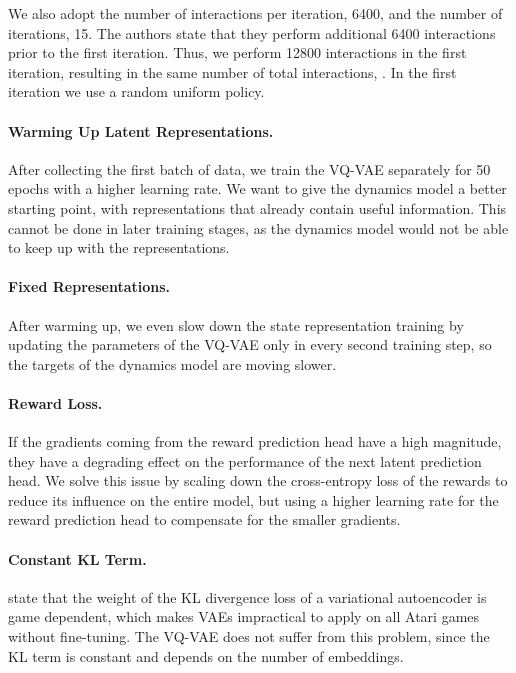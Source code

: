 \documentclass{article}
\begin{document}
We also adopt the number of interactions per iteration,
\num{6400}, and the number of iterations, \num{15}. The authors state that they
perform additional \num{6400} interactions prior to the first iteration. Thus,
we perform \num{12800} interactions in the first iteration, resulting in the
same number of total interactions, .
In the first iteration we use a random uniform policy.

\paragraph{Warming Up Latent Representations.}
After collecting the first batch of data, we train the VQ-VAE separately for
\num{50} epochs with a higher learning rate. We want to give the dynamics model
a better starting point, with representations that already contain useful
information. This cannot be done in later training stages, as the dynamics
model would not be able to keep up with the representations.

\paragraph{Fixed Representations.}
After warming up, we even slow down the state representation training by
updating the parameters of the VQ-VAE only in every second training step, so the
targets of the dynamics model are moving slower.

\paragraph{Reward Loss.}
If the gradients coming from the reward prediction head have a high magnitude,
they have a degrading effect on the performance of the next latent prediction
head. We solve this issue by scaling down the cross-entropy loss of the rewards
to reduce its influence on the entire model, but using a higher learning rate
for the reward prediction head to compensate for the smaller gradients.

\paragraph{Constant KL Term.}
\citet{simple} state that the weight of the KL divergence loss of a variational
autoencoder is game dependent, which makes VAEs impractical to apply on all
Atari games without fine-tuning. The VQ-VAE does not suffer from this problem,
since the KL term is constant and depends on the number of embeddings.
\end{document}
